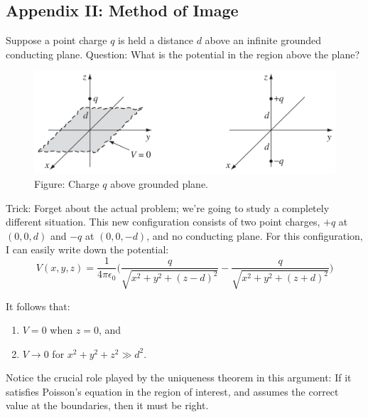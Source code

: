 \documentclass[../../../main.tex]{subfiles}
\begin{document}
\subsection*{Appendix II: Method of Image}
Suppose a point charge $q$ is held a distance $d$ above an inﬁnite grounded conducting plane. Question: What is the potential in the region above the plane? 
\begin{figure}[ht]
    \centering
    \includegraphics[width=\textwidth]{../Rss/Electromagnetism/Potential/MethIm.png}
    \caption*{Figure: Charge $q$ above grounded plane.}
\end{figure}
Trick: Forget about the actual problem; we're going to study a completely different situation. This new conﬁguration consists of two point charges, $+q$ at $(0, 0, d)$ and $-q$ at $(0, 0, -d)$, and no conducting plane. For this conﬁguration, I can easily write down the potential:
\begin{equation*}
    V(x,y,z)=\frac{1}{4\pi\epsilon_0}\biggl(\frac{q}{\sqrt{x^2+y^2+(z-d)^2}}-\frac{q}{\sqrt{x^2+y^2+(z+d)^2}}\biggr)
\end{equation*}

It follows that:
\begin{enumerate}
    \item $V = 0$ when $ z = 0$, and
    \item $V \rightarrow 0$ for $x^2 + y^2 + z^2 \gg d^2$.
\end{enumerate}
Notice the crucial role played by the uniqueness theorem in this argument: If it satisﬁes Poisson's equation in the region of interest, and assumes the correct value at the boundaries, then it must be right.
\end{document}
